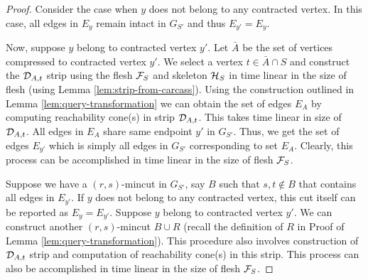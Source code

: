 \begin{proof}
Consider the case when $y$ does not belong to any contracted vertex. In this case, all edges in $E_y$ remain intact in $G_{S'}$ and thus $E_{y'}=E_{y}$.

Now, suppose $y$ belong to contracted vertex $y'$. Let $\bar A$ be the set of vertices compressed to contracted vertex $y'$. We select a vertex $t\in {\bar A} \cap S$ and construct the ${\cal D}_{A,t}$ strip using the flesh ${\cal F}_S$ and skeleton ${\cal H}_S$ in time linear in the size of flesh (using Lemma \ref{lem:strip-from-carcass}). Using the construction outlined in Lemma \ref{lem:query-transformation} we can obtain the set of edges $E_{A}$ by computing reachability cone(s) in strip ${\cal D}_{A,t}$. This takes time linear in size of ${\cal D}_{A,t}$. All edges in $E_A$ share same endpoint $y'$ in $G_{S'}$. Thus, we get the set of edges $E_{y'}$ which is simply all edges in $G_{S'}$ corresponding to set $E_A$. Clearly, this process can be accomplished in time linear in the size of flesh ${\cal F}_S$.

Suppose we have a $(r,s)$-mincut in $G_{S'}$, say $B$ such that $s,t \not\in B$ that contains all edges in $E_{y'}$. If $y$ does not belong to any contracted vertex, this cut itself can be reported as $E_y=E_{y'}$. Suppose $y$ belong to contracted vertex $y'$. We can construct another $(r,s)$-mincut $B\cup R$ (recall the definition of $R$ in Proof of Lemma \ref{lem:query-transformation}). This procedure also involves construction of ${\cal D}_{A,t}$ strip and computation of reachability cone(s) in this strip. This process can also be accomplished in time linear in the size of flesh ${\cal F}_S$.
\end{proof}